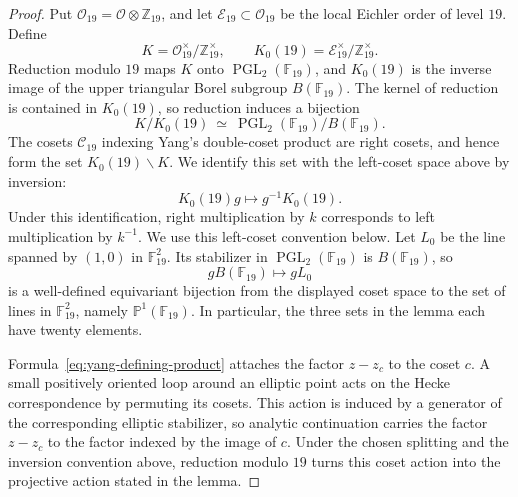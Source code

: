 \documentclass[10pt,a4paper]{amsart}
\newcommand{\F}{\mathbb{F}}
\newcommand{\PGL}{\operatorname{PGL}}
\newcommand{\PP}{\mathbb P}
\newcommand{\Z}{\mathbb{Z}}
\begin{document}
\begin{proof}

Put $\mathcal O_{19}=\mathcal O\otimes\Z_{19}$, and let
  $\mathcal E_{19}\subset\mathcal O_{19}$ be the local Eichler order of level
  $19$. Define
  \[
   K=\mathcal O_{19}^{\times}/\Z_{19}^{\times},
   \qquad
   K_0(19)=\mathcal E_{19}^{\times}/\Z_{19}^{\times}.
  \]  
Reduction modulo $19$ maps $K$ onto
$\PGL_2(\F_{19})$, and $K_0(19)$ is the inverse image of the upper triangular
Borel subgroup $B(\F_{19})$.  The kernel of reduction is contained in
$K_0(19)$, so reduction induces a bijection
\[
 K/K_0(19)\ \simeq\
 \PGL_2(\F_{19})/B(\F_{19}).
\]
The cosets $\mathcal C_{19}$ indexing Yang's double-coset product are right
cosets, and hence form the set $K_0(19)\backslash K$.  We identify this set
with the left-coset space above by inversion:
\[
 K_0(19)g\longmapsto g^{-1}K_0(19).
\]
Under this identification, right multiplication by $k$ corresponds to left
multiplication by $k^{-1}$.  We use this left-coset convention below.
Let $L_0$ be the line spanned by $(1,0)$ in $\F_{19}^2$.  Its stabilizer in
$\PGL_2(\F_{19})$ is $B(\F_{19})$, so
\[
 gB(\F_{19})\longmapsto gL_0
\]
is a well-defined equivariant bijection from the displayed coset space to
the set of lines in $\F_{19}^2$, namely $\PP^1(\F_{19})$.  In particular,
the three sets in the lemma each have twenty elements.

Formula~\eqref{eq:yang-defining-product} attaches the factor $z-z_c$ to the
coset $c$.  A small positively oriented loop around an elliptic point acts on
the Hecke correspondence by permuting its cosets.  This action is induced by
a generator of the corresponding elliptic stabilizer, so analytic
continuation carries the factor $z-z_c$ to the factor indexed by the image of
$c$.
Under the chosen splitting and the inversion convention above, reduction
modulo $19$ turns this coset action into the projective action stated in the
lemma.
\end{proof}
\end{document}
